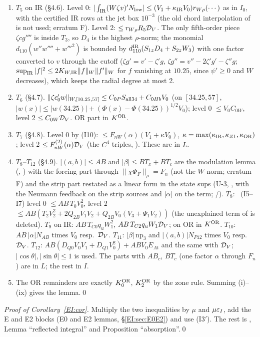 \documentclass[11pt]{article}
\begin{document}
\begin{enumerate}[label=\textup{(\roman*)},leftmargin=2.2em]
\item $T_5$ on IR (\S4.6). Level 0: $|\int_{\rm IR}(W\zeta v)'N_{\rm low}|\le(V_1+\kappa_{\rm IR}V_0)r_{W\rho}(\cdots)$ as in $I_0$, with the certified IR rows at the jet box $10^{-3}$ (the old chord interpolation of  is not used; erratum F). Level 2: $\le r_{W\rho}R_5\mathcal D_V$. The only fifth-order piece $\zeta cg''''$ is inside $T_3$, so $D_4$ is the highest $\rho$-norm; the monomial $d_{110}(w''w''''+w'''^2)$ is bounded by $d^{\rm IR}_{110}(S_{1z}D_4+S_{2z}W_3)$ with one factor converted to $v$ through the cutoff ($\zeta g'=v'-\zeta'g$, $\zeta g''=v''-2\zeta'g'-\zeta''g$; $\sup_{\rm IR}|f|^2\le2K_{W,\rm IR}\|f\|_W\|f'\|_W$ for $f$ vanishing at $10.25$, since $\psi'\ge0$ and $W$ decreases), which keeps the radial degree at most 2.
\item $T_6$ (\S4.7). $\|\zeta c_0'w\|_{W,[10.25,57]}\le C_{0P}S_{\rm all34}+C_{0Hb}V_0$ (on $[34.25,57]$, $|w(x)|\le|w(34.25)|+(\Phi(x)-\Phi(34.25))^{1/2}V_0$); level 0 $\le V_0C_{0W}$, level 2 $\le C_{0W}\mathcal D_V$. OR part in $K^{\mathrm{OR}}$.
\item $T_7$ (\S4.8). Level 0 by (I10): $\le F_{nW}(\alpha)(V_1+\kappa V_0)$, $\kappa=\max(\kappa_{\rm IR},\kappa_{Z1},\kappa_{\mathrm{OR}})$; level 2 $\le F^{(2)}_{nW}(\alpha)\mathcal D_V$ (the $C^4$ triples, ). These are in $L$.
\item $T_8$--$T_{12}$ (\S4.9). $|(a,b)|\le AB$ and $|\beta|\le BT_x+BT_c$ are the modulation lemma (, ) with the forcing part through $\|\chi\Phi_F\|_\rho=F_n$ (not the $W$-norm; erratum F) and the strip part restated as a linear form in the state sups (U-3, , with the Neumann feedback on the strip sources and $|\alpha|$ on the  term; \tC/\tR). $T_8$: \tS\ (I5--I7) level 0 $\le AB\,T_0V_0^2$, level 2 $\le AB(T_2V_2^2+2Q_{2B}V_1V_2+Q_{2B}V_0(V_3+\Psi_1V_2))$ (the unexplained  term of  is deleted). $T_9$ on IR: $AB\,T_{C0}q_uW_1^2$, $AB\,T_{C2}q_uW_1\mathcal D_V$; on OR in $K^{\mathrm{OR}}$. $T_{10}$: $AB\,|\alpha|N_{AB}$ times $V_0$ resp.\ $\mathcal D_V$. $T_{11}$: $|\beta|\,\mathrm{np}_3$ and $|(a,b)|N_{P12}$ times $V_0$ resp.\ $\mathcal D_V$. $T_{12}$: $AB(D_{Q0}V_0V_1+D_{Q1}V_0^2)+ABV_0E_{At}$ and the same with $\mathcal D_V$; $|\cos\theta|,|\sin\theta|\le1$ is used. The parts with $AB_c$, $BT_c$ (one factor $\alpha$ through $F_n$) are in $L$; the rest in $I$.
\item The OR remainders are exactly $K_0^{\mathrm{OR}}$, $K_2^{\mathrm{OR}}$ by the zone rule. Summing (i)--(ix) gives the lemma.\qed
\end{enumerate}
\noindent\emph{Proof of Corollary~\ref{EI:cor}.} Multiply the two inequalities by $\mu$ and $\mu\varepsilon_I$, add the E and E2 blocks (E0 and E2 lemmas, \S\ref{EI:sec:E0E2}) and use (I3$'$). The rest is , Lemma ``reflected integral'' and Proposition ``absorption''.\qed
\end{document}
